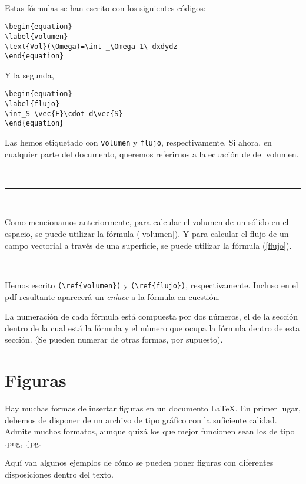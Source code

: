 \documentclass[a4paper,12pt]{article}
\begin{document}
{\ 

Estas fórmulas se han escrito con los siguientes códigos:

\begin{verbatim}
\begin{equation}
\label{volumen}
\text{Vol}(\Omega)=\int _\Omega 1\ dxdydz
\end{equation}
\end{verbatim}

Y la segunda,

\begin{verbatim}
\begin{equation}
\label{flujo}
\int_S \vec{F}\cdot d\vec{S}
\end{equation}
\end{verbatim}

Las hemos etiquetado con \verb|volumen| y \verb|flujo|, respectivamente. Si ahora, en cualquier parte del documento, queremos referirnos a la ecuación de del volumen.

\ 

\hrule

\ 

Como mencionamos anteriormente, para calcular el volumen de un sólido en el espacio, se puede utilizar la fórmula (\ref{volumen}). Y para calcular el flujo de un campo vectorial a través de una superficie, se puede utilizar la fórmula (\ref{flujo}).

\ 

Hemos escrito \verb|(\ref{volumen})| y \verb|(\ref{flujo})|, respectivamente. Incluso en el pdf resultante aparecerá un \textsl{enlace} a la fórmula en cuestión.

La numeración de cada fórmula está compuesta por dos números, el de la sección dentro de la cual está la fórmula y el número que ocupa la fórmula dentro de esta sección. (Se pueden numerar de otras formas, por supuesto).



\section{Figuras}


Hay muchas formas de insertar figuras en un documento \LaTeX. En primer lugar, debemos de disponer de un archivo de tipo gráfico con la suficiente calidad. Admite muchos formatos, aunque quizá los que mejor funcionen sean los de tipo .png, .jpg.

 Aquí van algunos ejemplos de cómo se pueden poner figuras con diferentes disposiciones dentro del texto.

}
\end{document}
